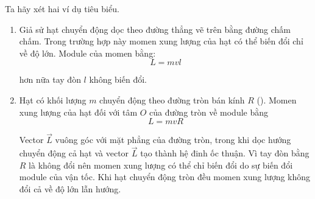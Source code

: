 Ta hãy xét hai ví dụ tiêu biểu. 
\begin{enumerate}[1.]
	\item Giả sử hạt chuyển động dọc theo đường thẳng vẽ trên  bằng đường chấm chấm. Trong trường hợp này momen xung lượng của hạt có thể biến đổi chỉ về độ lớn. Module của momen bằng:
	\begin{equation}\label{eq:3_110}
	L = mvl
	\end{equation}

	\noindent
	hơn nữa tay đòn $l$ không biến đổi.
	\item Hạt có khối lượng $m$ chuyển động theo đường tròn bán kính $R$  (). Momen xung lượng của hạt đối với tâm $O$ của đường tròn về module bằng 
	\begin{equation}\label{eq:3_111}
	L = mvR
	\end{equation}

	\noindent
	Vector $\vec{L}$ vuông góc với mặt phẳng của đường tròn, trong khi dọc hướng chuyển động cả hạt và vector $\vec{L}$ tạo thành hệ đinh ốc thuận. Vì tay đòn bằng $R$ là không đổi nên momen xung lượng có thể chỉ biến đổi do sự biến đổi module của vận tốc. Khi hạt chuyển động tròn đều momen xung lượng không đổi cả về độ lớn lẫn hướng.
\end{enumerate}

